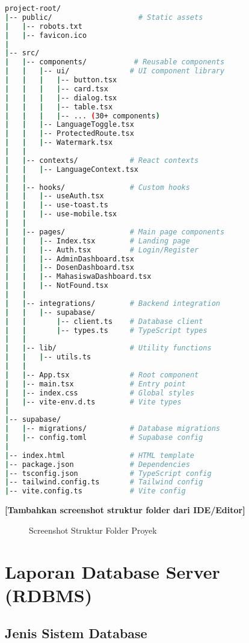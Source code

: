 \documentclass[12pt,a4paper]{article}
\begin{document}
\begin{lstlisting}[language=bash]
project-root/
|-- public/                    # Static assets
|   |-- robots.txt
|   |-- favicon.ico
|
|-- src/
|   |-- components/           # Reusable components
|   |   |-- ui/              # UI component library
|   |   |   |-- button.tsx
|   |   |   |-- card.tsx
|   |   |   |-- dialog.tsx
|   |   |   |-- table.tsx
|   |   |   |-- ... (30+ components)
|   |   |-- LanguageToggle.tsx
|   |   |-- ProtectedRoute.tsx
|   |   |-- Watermark.tsx
|   |
|   |-- contexts/            # React contexts
|   |   |-- LanguageContext.tsx
|   |
|   |-- hooks/               # Custom hooks
|   |   |-- useAuth.tsx
|   |   |-- use-toast.ts
|   |   |-- use-mobile.tsx
|   |
|   |-- pages/               # Main page components
|   |   |-- Index.tsx        # Landing page
|   |   |-- Auth.tsx         # Login/Register
|   |   |-- AdminDashboard.tsx
|   |   |-- DosenDashboard.tsx
|   |   |-- MahasiswaDashboard.tsx
|   |   |-- NotFound.tsx
|   |
|   |-- integrations/        # Backend integration
|   |   |-- supabase/
|   |       |-- client.ts    # Database client
|   |       |-- types.ts     # TypeScript types
|   |
|   |-- lib/                 # Utility functions
|   |   |-- utils.ts
|   |
|   |-- App.tsx              # Root component
|   |-- main.tsx             # Entry point
|   |-- index.css            # Global styles
|   |-- vite-env.d.ts        # Vite types
|
|-- supabase/
|   |-- migrations/          # Database migrations
|   |-- config.toml          # Supabase config
|
|-- index.html               # HTML template
|-- package.json             # Dependencies
|-- tsconfig.json            # TypeScript config
|-- tailwind.config.ts       # Tailwind config
|-- vite.config.ts           # Vite config
\end{lstlisting}

\textbf{[Tambahkan screenshot struktur folder dari IDE/Editor]}

\begin{figure}[H]
\centering
{}
\caption{Screenshot Struktur Folder Proyek}
\end{figure}

\newpage
\section{Laporan Database Server (RDBMS)}

\subsection{Jenis Sistem Database}
\end{document}
